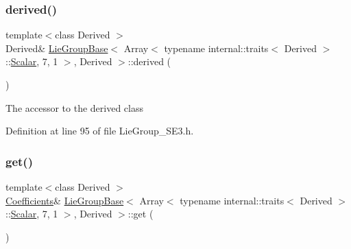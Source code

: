 \subsubsection{\texorpdfstring{derived()}{derived()}\hspace{0.1cm}{\footnotesize\ttfamily [2/2]}}
{\footnotesize\ttfamily template$<$class Derived $>$ \\
Derived\& \hyperlink{class_lie_group_base}{Lie\+Group\+Base}$<$ Array$<$ typename internal\+::traits$<$ Derived $>$\+::\hyperlink{class_lie_group_base_3_01_array_3_01typename_01internal_1_1traits_3_01_derived_01_4_1_1_scalar_0d6d4b5459662fc32c7117aee50362fb1_a831695c575380c9a1df32eff9fc4a8c6}{Scalar}, 7, 1 $>$, Derived $>$\+::derived (\begin{DoxyParamCaption}{ }\end{DoxyParamCaption})\hspace{0.3cm}{\ttfamily [inline]}}

The accessor to the derived class 

Definition at line 95 of file Lie\+Group\+\_\+\+S\+E3.\+h.

\hypertarget{class_lie_group_base_3_01_array_3_01typename_01internal_1_1traits_3_01_derived_01_4_1_1_scalar_0d6d4b5459662fc32c7117aee50362fb1_a25deecc8f12c51f78fc0c82973443377}{}\label{class_lie_group_base_3_01_array_3_01typename_01internal_1_1traits_3_01_derived_01_4_1_1_scalar_0d6d4b5459662fc32c7117aee50362fb1_a25deecc8f12c51f78fc0c82973443377} 
\subsubsection{\texorpdfstring{get()}{get()}\hspace{0.1cm}{\footnotesize\ttfamily [1/2]}}
{\footnotesize\ttfamily template$<$class Derived $>$ \\
\hyperlink{class_lie_group_base_3_01_array_3_01typename_01internal_1_1traits_3_01_derived_01_4_1_1_scalar_0d6d4b5459662fc32c7117aee50362fb1_a51943ca22e0a551b6d1d82e11ee073fe}{Coefficients}\& \hyperlink{class_lie_group_base}{Lie\+Group\+Base}$<$ Array$<$ typename internal\+::traits$<$ Derived $>$\+::\hyperlink{class_lie_group_base_3_01_array_3_01typename_01internal_1_1traits_3_01_derived_01_4_1_1_scalar_0d6d4b5459662fc32c7117aee50362fb1_a831695c575380c9a1df32eff9fc4a8c6}{Scalar}, 7, 1 $>$, Derived $>$\+::get (\begin{DoxyParamCaption}{ }\end{DoxyParamCaption})\hspace{0.3cm}{\ttfamily [inline]}}

